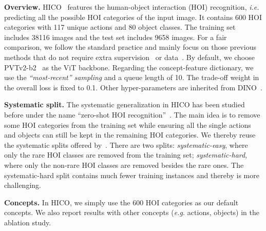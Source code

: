 \documentclass{article} \usepackage{iclr2022_conference,times}
\renewcommand{\paragraph}[1]{\noindent\textbf{#1.}}
\begin{document}
\paragraph{Overview} HICO~\citep{hico} features the human-object interaction (HOI) recognition, \emph{i.e.} predicting all the possible HOI categories of the input image. It contains 600 HOI categories with 117 unique actions and 80 object classes. The training set includes 38116 images and the test set includes 9658 images. For a fair comparison, we follow the standard practice and mainly focus on those previous methods that do not require extra supervision~\citep{fang2018pairwise} 
or data~\citep{li2020pastanet,li2019hake,jin2021object}.
By default, we choose PVTv2-b2~\citep{wang2021pvtv2} as the ViT backbone. Regarding the concept-feature dictionary, we use the \textit{``most-recent'' sampling} and a queue length  of 10. The trade-off weight  in the overall loss is fixed to 0.1. Other hyper-parameters are inherited from DINO~\citep{dino}.

\paragraph{Systematic split} The systematic generalization in HICO has been studied before under the name ``zero-shot HOI recognition''~\citep{zeroshothoi}. The main idea is to remove some HOI categories from the training set while ensuring all the single actions and objects can still be kept in the remaining HOI categories. We thereby reuse the systematic splits offered by~\cite{vcl}. There are two splits: \emph{systematic-easy}, where only the rare HOI classes are removed from the training set; \emph{systematic-hard}, where only the non-rare HOI classes are removed besides the rare ones.
The systematic-hard split contains much fewer training instances and thereby is more challenging.

\paragraph{Concepts} In HICO, we simply use the 600 HOI categories as our default concepts. 
We also report results with other concepts (\emph{e.g.} actions, objects) in the ablation study.
\end{document}
